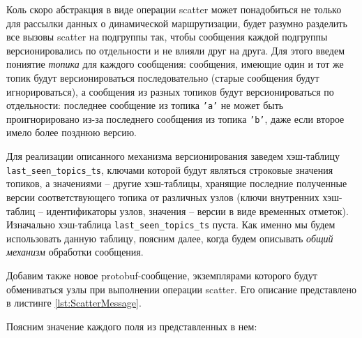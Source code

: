 \documentclass{article}
\theoremstyle{plain}
\theoremstyle{plain}
\theoremstyle{plain}
\theoremstyle{plain}
\theoremstyle{definition}
\theoremstyle{remark}
\theoremstyle{plain}
\begin{document}
Коль скоро абстракция в виде операции scatter может понадобиться не только для рассылки данных о динамической маршрутизации, будет разумно разделить все вызовы scatter на подгруппы так, чтобы сообщения каждой подгруппы версионировались по отдельности и не влияли друг на друга. Для этого введем пониятие \textit{топика} для каждого сообщения: сообщения, имеющие один и тот же топик будут версионироваться последовательно (старые сообщения будут игнорироваться), а сообщения из разных топиков будут версионироваться по отдельности: последнее сообщение из топика \texttt{'a'} не может быть проигнорировано из-за последнего сообщения из топика \texttt{'b'}, даже если второе имело более позднюю версию.

Для реализации описанного механизма версионирования заведем хэш-таблицу \\
\texttt{last\_seen\_topics\_ts}, ключами которой будут являться строковые значения топиков, а значениями -- другие хэш-таблицы, хранящие последние полученные версии соответствующего топика от различных узлов (ключи внутренних хэш-таблиц -- идентификаторы узлов, значения -- версии в виде временных отметок). Изначально хэш-таблица \texttt{last\_seen\_topics\_ts} пуста. Как именно мы будем использовать данную таблицу, поясним далее, когда будем описывать \textit{общий механизм} обработки сообщения.

Добавим также новое protobuf-сообщение, экземплярами которого будут обмениваться узлы при выполнении операции scatter. Его описание представлено в листинге \ref{lst:ScatterMessage}.



Поясним значение каждого поля из представленных в нем:
\end{document}
